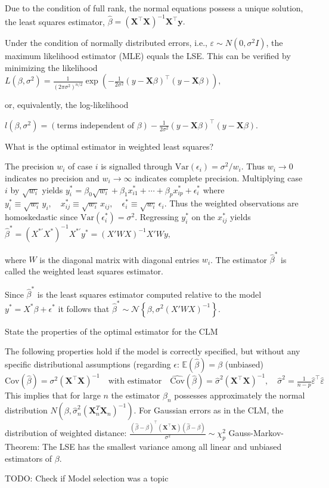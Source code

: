 \documentclass[11pt,a4paper,twoside]{article}
\begin{document}
Due to the condition of full rank, the normal equations possess a unique solution, the least squares estimator, 
\(\hat{\beta} = (\mathbf{X}^\top \mathbf{X})^{-1} \mathbf{X}^\top \mathbf{y}.\)

Under the condition of normally distributed errors, i.e., \(\varepsilon \sim N(0, \sigma^2 I)\), 
the maximum likelihood estimator (MLE) equals the LSE.
This can be verified by minimizing the likelihood \(L(\beta, \sigma^2) = \frac{1}{(2\pi\sigma^2)^{n/2}} \exp \left( -\frac{1}{2\sigma^2} (y - \mathbf{X}\beta)^\top (y - \mathbf{X}\beta) \right),\)

or, equivalently, the log-likelihood

\(l(\beta, \sigma^2) = (\text{terms independent of } \beta) - \frac{1}{2\sigma^2} (y - \mathbf{X}\beta)^\top (y - \mathbf{X}\beta).\)


What is the optimal estimator in weighted least squares? 

The precision \(w_i\) of case \(i\) is signalled through \(\text{Var}(\epsilon_i) = \sigma^2 / w_i\). 
Thus \(w_i \to 0\) indicates no precision and \(w_i \to \infty\) indicates complete precision. 
Multiplying case \(i\) by \(\sqrt{w_i}\) yields 
\(y_i^* = \beta_0 \sqrt{w_i} + \beta_1 x_{i1}^* + \cdots + \beta_p x_{ip}^* + \epsilon_i^*\)
where
\(y_i^* \equiv \sqrt{w_i} \, y_i, \quad x_{ij}^* \equiv \sqrt{w_i} \, x_{ij}, \quad \epsilon_i^* \equiv \sqrt{w_i} \, \epsilon_i.\)
Thus the weighted observations are homoskedastic since \(\text{Var}(\epsilon_i^*) = \sigma^2\). Regressing \(y_i^*\) on the \(x_{ij}^*\) yields 
\(\hat{\beta}^* = (X^{*'} X^*)^{-1} X^{*'} y^* = (X'WX)^{-1}X'Wy,\)

where \(W\) is the diagonal matrix with diagonal entries \(w_i\). The estimator \(\hat{\beta}^*\) is called the weighted least squares estimator. 

Since \(\hat{\beta}^*\) is the least squares estimator computed relative to the model \(y^* = X^*\beta + \epsilon^*\) it follows that
\(\hat{\beta}^* \sim \mathcal{N} \left\{ \beta, \sigma^2 (X'WX)^{-1} \right\}.\)



State the properties of the optimal estimator for the CLM

The following properties hold if the model is correctly specified, but without any specific distributional assumptions (regarding \( \epsilon \):
\(\mathbb{E}(\hat{\beta}) = \beta\) (unbiased)
\(
\text{Cov}(\hat{\beta}) = \sigma^2 (\mathbf{X}^\top \mathbf{X})^{-1} \quad \text{with estimator} \quad \widehat{\text{Cov}}(\hat{\beta}) = \hat{\sigma}^2 (\mathbf{X}^\top \mathbf{X})^{-1}, \quad \hat{\sigma}^2 = \frac{1}{n-p} \hat{\varepsilon}^\top \hat{\varepsilon}
\)
This implies that for large \( n \) the estimator \( \hat{\beta}_n \) possesses approximately the normal distribution
\(
  N\left( \beta, \hat{\sigma}^2_n (\mathbf{X}_n^T \mathbf{X}_n)^{-1} \right).
\)
For Gaussian errors as in the CLM, the distribution of weighted distance:
\(
\frac{(\hat{\beta} - \beta)^\top (\mathbf{X}^\top \mathbf{X})(\hat{\beta} - \beta)}{\sigma^2} \sim \chi^2_p
\)
Gauss-Markov-Theorem: The LSE has the smallest variance among all linear and unbiased estimators of \(\beta\).



TODO: Check if Model selection was a topic
\end{document}
